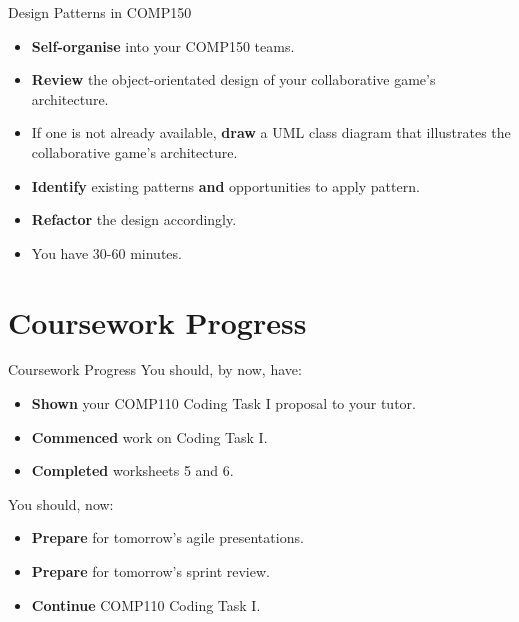 \begin{frame}{Design Patterns in COMP150}
	\begin{itemize}
		\item \textbf{Self-organise} into your COMP150 teams.
		\item \textbf{Review} the object-orientated design of your collaborative game's architecture.
		\item If one is not already available, \textbf{draw} a UML class diagram that illustrates the collaborative game's architecture.
		\item \textbf{Identify} existing patterns \textbf{and} opportunities to apply pattern.
		\item \textbf{Refactor} the design accordingly.
		\item You have 30-60 minutes.
	\end{itemize}
\end{frame}
		
\part{Coursework Progress}
\frame{\partpage}

\begin{frame}{Coursework Progress}
You should, by now, have:

	\begin{itemize}
		\item \textbf{Shown} your COMP110 Coding Task I proposal to your tutor.
		\item \textbf{Commenced} work on Coding Task I. 
		\item \textbf{Completed} worksheets 5 and 6. 
	\end{itemize}
	
You should, now:

	\begin{itemize}
		\item \textbf{Prepare} for tomorrow's agile presentations. 
		\item \textbf{Prepare} for tomorrow's sprint review. 
		\item \textbf{Continue} COMP110 Coding Task I.
	\end{itemize}
\end{frame}


%


